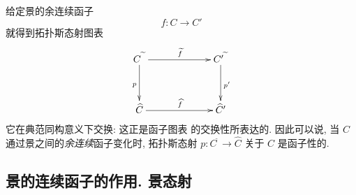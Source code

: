 给定景的余连续函子
$$
f:C\longrightarrow C'
$$
就得到\pageoriginale 拓扑斯态射图表
\[
\xymatrix@C=2.25cm@R=1.25cm{ C^{\widetilde{\phantom{a}}} \ar[d]_{p}
\ar[r]^{\widetilde{f}} &
C'^{\widetilde{\phantom{a}}} \ar[d]^{p'}\\
\widehat{C} \ar[r]^{\widehat{f}}&  \widehat{C}' }
\]
它在典范同构意义下交换: 这正是函子图表  的交换性所表达的. 因此可以说, 当 $C$ 通过景之间的\emph{余连续}函子变化时, 拓扑斯态射 $p:C^{\widetilde{\phantom{,}}}\rightarrow \widehat{C}$ 关于 $C$ 是函子性的.




\subsection{景的连续函子的作用. 景态射}

